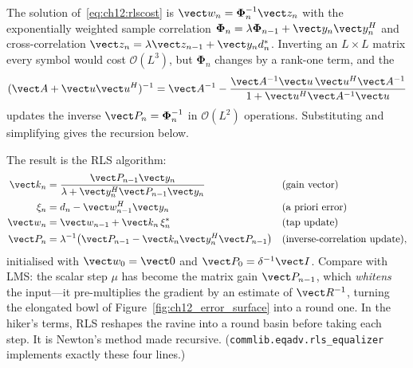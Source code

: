 
\begin{deeper}
The solution of~\eqref{eq:ch12:rlscost} is $\vect w_n=\boldsymbol\Phi_n^{-1}\vect z_n$ with the
exponentially weighted sample correlation $\boldsymbol\Phi_n=\lambda\boldsymbol\Phi_{n-1}+\vect y_n\vect
y_n^H$ and cross-correlation $\vect z_n=\lambda\vect z_{n-1}+\vect y_nd_n^*$. Inverting an
$L\times L$ matrix every symbol would cost $\mathcal O(L^3)$, but $\boldsymbol\Phi_n$ changes by a
rank-one term, and the 
\begin{equation}
(\vect A+\vect u\vect u^H)^{-1}=\vect A^{-1}-\frac{\vect A^{-1}\vect u\,\vect u^H\vect A^{-1}}{1+\vect u^H\vect A^{-1}\vect u}
\end{equation}
updates the inverse $\vect P_n=\boldsymbol\Phi_n^{-1}$ in $\mathcal O(L^2)$ operations. Substituting
and simplifying gives the recursion below.
\end{deeper}

The result is the RLS algorithm:
\begin{align}
\vect k_n&=\frac{\vect P_{n-1}\vect y_n}{\lambda+\vect y_n^H\vect P_{n-1}\vect y_n}
&&\text{(gain vector)}\nonumber\\
\xi_n&=d_n-\vect w_{n-1}^H\vect y_n &&\text{(a priori error)}\nonumber\\
\vect w_n&=\vect w_{n-1}+\vect k_n\,\xi_n^* &&\text{(tap update)}\label{eq:ch12:rls}\\
\vect P_n&=\lambda^{-1}\big(\vect P_{n-1}-\vect k_n\vect y_n^H\vect P_{n-1}\big)
&&\text{(inverse-correlation update)},\nonumber
\end{align}
initialised with $\vect w_0=\vect 0$ and $\vect P_0=\delta^{-1}\vect I$. Compare with LMS: the scalar
step $\mu$ has become the matrix gain $\vect P_{n-1}$, which \emph{whitens} the input---it
pre-multiplies the gradient by an estimate of $\vect R^{-1}$, turning the elongated bowl of
Figure~\ref{fig:ch12_error_surface} into a round one. In the hiker's terms, RLS reshapes the ravine
into a round basin before taking each step. It is Newton's method made recursive.
(\texttt{commlib.eqadv.rls\_equalizer} implements exactly these four lines.)

